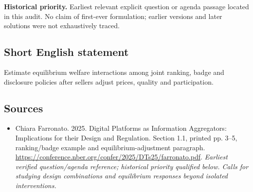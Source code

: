 \documentclass[11pt]{article}
\begin{document}
\par\textbf{Historical priority.} Earliest relevant explicit question or agenda passage located in this audit. No claim of first-ever formulation; earlier versions and later solutions were not exhaustively traced.

\subsection{Short English statement}
Estimate equilibrium welfare interactions among joint ranking, badge and disclosure policies after sellers adjust prices, quality and participation.

\subsection{Sources}
\begin{itemize}\raggedright
\item[\textnormal{[S1]}]\hypertarget{source:30007683:1}{} Chiara Farronato. 2025. Digital Platforms as Information Aggregators: Implications for their Design and Regulation. Section 1.1, printed pp. 3–5, ranking/badge example and equilibrium-adjustment paragraph.
\url{https://conference.nber.org/confer/2025/DTs25/farronato.pdf}.
{\small\textit{Earliest verified question/agenda reference; historical priority qualified below. Calls for studying design combinations and equilibrium responses beyond isolated interventions.}}
\end{itemize}
\end{document}
